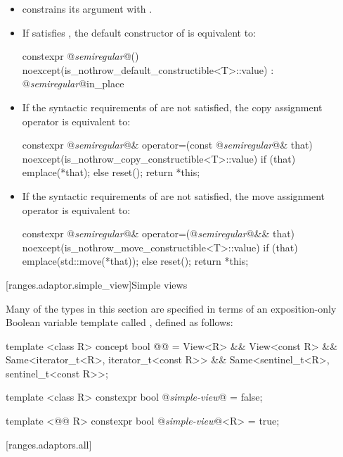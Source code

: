\begin{itemize}
\item {} constrains its argument with .
\item If  satisfies , the default constructor of
 is equivalent to:
\begin{codeblock}
constexpr @\textit{semiregular}@()
  noexcept(is_nothrow_default_constructible<T>::value)
: @\textit{semiregular}@{in_place} {}
\end{codeblock}
\item If the syntactic requirements of  are not satisfied, the
copy assignment operator is equivalent to:
\begin{codeblock}
constexpr @\textit{semiregular}@& operator=(const @\textit{semiregular}@& that)
  noexcept(is_nothrow_copy_constructible<T>::value) {
  if (that) emplace(*that);
  else reset();
  return *this;
}
\end{codeblock}
\item If the syntactic requirements of  are not satisfied, the
move assignment operator is equivalent to:
\begin{codeblock}
constexpr @\textit{semiregular}@& operator=(@\textit{semiregular}@&& that)
  noexcept(is_nothrow_move_constructible<T>::value) {
  if (that) emplace(std::move(*that));
  else reset();
  return *this;
}
\end{codeblock}
\end{itemize}

{\color{addclr}
[ranges.adaptor.simple_view]{Simple views}

\pnum
Many of the types in this section are specified in terms of an exposition-only
Boolean variable template called , defined as follows:

\begin{codeblock}
template <class R>
concept bool @\textit{}@ =
  View<R> && View<const R> &&
  Same<iterator_t<R>, iterator_t<const R>> &&
  Same<sentinel_t<R>, sentinel_t<const R>>;

template <class R>
  constexpr bool @\textit{simple-view}@ = false;

template <@\textit{}@ R>
  constexpr bool @\textit{simple-view}@<R> = true;
\end{codeblock}
}

[ranges.adaptors.all]{}

